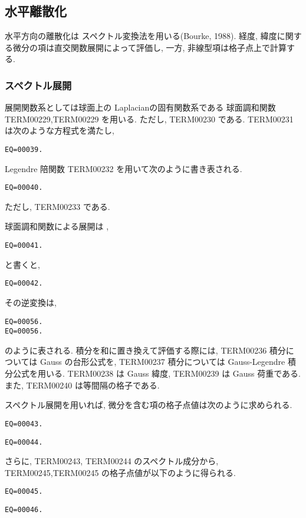 ﻿\subsection{水平離散化}

水平方向の離散化は
スペクトル変換法を用いる(Bourke, 1988).
経度, 緯度に関する微分の項は直交関数展開によって評価し,
一方, 非線型項は格子点上で計算する.

\subsubsection{スペクトル展開}

展開関数系としては球面上の Laplacianの固有関数系である
球面調和関数 TERM00229,TERM00229 を用いる.
ただし, TERM00230 である.
TERM00231 は次のような方程式を満たし,
%
\begin{verbatim}
EQ=00039.
\end{verbatim}
%
Legendre 陪関数 TERM00232 を用いて次のように書き表される.
%
\begin{verbatim}
EQ=00040.
\end{verbatim}
%
ただし, TERM00233 である.

球面調和関数による展開は \footnotemark ,
\begin{verbatim}
EQ=00041.
\end{verbatim}
と書くと,
%
%
\begin{verbatim}
EQ=00042.
\end{verbatim}
%
その逆変換は,
\begin{verbatim}
EQ=00056.
EQ=00056.
\end{verbatim}
%
のように表される.
%
積分を和に置き換えて評価する際には,
TERM00236 積分については Gauss の台形公式を,
TERM00237 積分については Gauss-Legendre 積分公式を用いる.
TERM00238 は Gauss 緯度, TERM00239 は Gauss 荷重である.
また, TERM00240 は等間隔の格子である.

スペクトル展開を用いれば,
微分を含む項の格子点値は次のように求められる.
%
\begin{verbatim}
EQ=00043.
\end{verbatim}
%
\begin{verbatim}
EQ=00044.
\end{verbatim}
%
さらに,
TERM00243, TERM00244 のスペクトル成分から, 
TERM00245,TERM00245 の格子点値が以下のように得られる.
%
\begin{verbatim}
EQ=00045.
\end{verbatim}
%
\begin{verbatim}
EQ=00046.
\end{verbatim}

